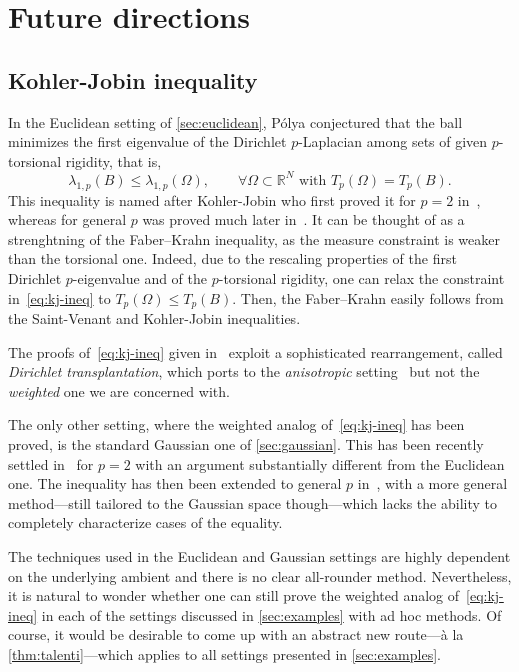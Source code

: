 \documentclass[a4paper,12pt,reqno]{amsart}
\numberwithin{equation}{section}
\theoremstyle{plain}
\theoremstyle{definition}
\begin{document}
\section{Future directions}
\label{sec:future}

%
\subsection{Kohler-Jobin inequality}
\label{ssec:kj-ineq}
%
In the Euclidean setting of \cref{sec:euclidean}, P\'olya conjectured that the ball minimizes the first eigenvalue of the Dirichlet $p$-Laplacian among sets of given $p$-torsional rigidity, that is,
%
\begin{equation}
\label{eq:kj-ineq}
\lambda_{1,p} (B) \le \lambda_{1,p} (\Omega), \qquad \forall \Omega\subset \mathbb{R}^N \text{ with } T_p(\Omega)=T_p(B).
\end{equation}
%
This inequality is named after Kohler-Jobin who first proved it for $p=2$ in~\cite{KJ78,KJ82}, whereas for general $p$ was proved much later in~\cite{Bra14}. 
It can be thought of as a strenghtning of the Faber--Krahn inequality, as the measure constraint is weaker than the torsional one. Indeed, due to the rescaling properties of the first Dirichlet $p$-eigenvalue and of the $p$-torsional rigidity, one can relax the constraint in~\eqref{eq:kj-ineq} to $T_p(\Omega)\le T_p(B)$. Then, the Faber--Krahn easily follows from the Saint-Venant and Kohler-Jobin inequalities.

The proofs of~\eqref{eq:kj-ineq} given in~\cite{Bra14,KJ78,KJ82} exploit a sophisticated rearrangement, called \emph{Dirichlet transplantation}, which ports to the \emph{anisotropic} setting~\cite[Sect.~6]{Bra14} but not the \emph{weighted} one we are concerned with.

The only other setting, where the weighted analog of~\eqref{eq:kj-ineq} has been proved, is the standard Gaussian one of \cref{sec:gaussian}. This has been recently settled in~\cite{HL24} for $p=2$ with an argument substantially different from the Euclidean one. The inequality has then been extended to general $p$ in~\cite{CFMW26}, with a more general method---still tailored to the Gaussian space though---which lacks the ability to completely characterize cases of the equality.

The techniques used in the Euclidean and Gaussian settings are highly dependent on the underlying ambient and there is no clear all-rounder method. Nevertheless, it is natural to wonder whether one can still prove the weighted analog of~\eqref{eq:kj-ineq} in each of the settings discussed in \cref{sec:examples} with ad hoc methods. Of course, it would be desirable to come up with an abstract new route---\`a la \cref{thm:talenti}---which applies to all settings presented in \cref{sec:examples}.
\end{document}
